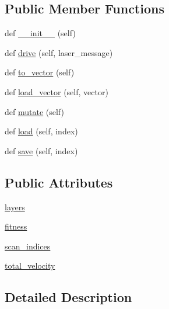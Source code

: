 \subsection*{Public Member Functions}
\begin{DoxyCompactItemize}
\item 
def \hyperlink{classneural__car__driver_1_1_neural_car_driver_ab0cc2f18e4345f9814fa137028336d1a}{\+\_\+\+\_\+init\+\_\+\+\_\+} (self)
\item 
def \hyperlink{classneural__car__driver_1_1_neural_car_driver_ab46c72e7432f683a99788c8efc3c9741}{drive} (self, laser\+\_\+message)
\item 
def \hyperlink{classneural__car__driver_1_1_neural_car_driver_aa9ca18514eaf2ebe42c9c88f6c99ccac}{to\+\_\+vector} (self)
\item 
def \hyperlink{classneural__car__driver_1_1_neural_car_driver_a4c42a4dff190065b381d5de451accf9f}{load\+\_\+vector} (self, vector)
\item 
def \hyperlink{classneural__car__driver_1_1_neural_car_driver_a1c57aa3cbee31e70a7eacb9c542d5848}{mutate} (self)
\item 
def \hyperlink{classneural__car__driver_1_1_neural_car_driver_a5710c7f4ee2118b6a3dadfe736f643dc}{load} (self, index)
\item 
def \hyperlink{classneural__car__driver_1_1_neural_car_driver_ab87f551fdb7503ab8f6afe190f51623d}{save} (self, index)
\end{DoxyCompactItemize}
\subsection*{Public Attributes}
\begin{DoxyCompactItemize}
\item 
\hyperlink{classneural__car__driver_1_1_neural_car_driver_a425f558140c554a734fad61b9eb83940}{layers}
\item 
\hyperlink{classneural__car__driver_1_1_neural_car_driver_a4d709e4419449add88e2a1a5d825e918}{fitness}
\item 
\hyperlink{classneural__car__driver_1_1_neural_car_driver_ac7a4e813a3f642cdb4c88a3c7bcc0ac7}{scan\+\_\+indices}
\item 
\hyperlink{classneural__car__driver_1_1_neural_car_driver_a0d1f352fc537723d9ba1048317b56942}{total\+\_\+velocity}
\end{DoxyCompactItemize}


\subsection{Detailed Description}


